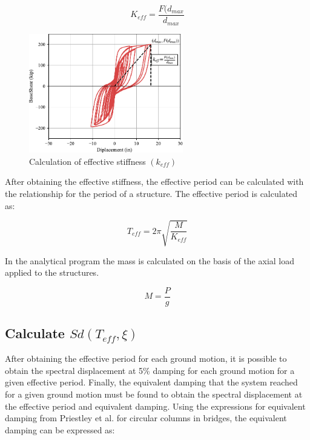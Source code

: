 \begin{equation}
     K_{eff}=\frac{F(d_{max}}{d_{max}}
    \label{eq:Keff_calcualtion}
\end{equation}

\begin{figure}[htbp]
	\centering
	\includegraphics[width=0.60\textwidth]{VAC Thesis 2.0/Chapter-5/figs/Force_Diplacement_Keff_Calc.pdf}
	\caption{Calculation of effective stiffness $(k_{eff})$}
	\label{fig:k_eff_calculation}
\end{figure}

After obtaining the effective stiffness, the effective period can be calculated with the relationship for the period of a structure. The effective period is calculated as:

\begin{equation}
     T_{eff}=2\pi \sqrt{\frac{M}{K_{eff}}}
     
    \label{eq:Teff_calcualtion}
\end{equation}

In the analytical program the mass is calculated on the basis of the axial load applied to the structures. 

\begin{equation}
    M=\frac{P}{g}
    \label{eq:M_calcualtion}
\end{equation}

\subsection{Calculate $Sd(T_{eff},\xi)$}

After obtaining the effective period for each ground motion, it is possible to obtain the spectral displacement at 5\% damping for each ground motion for a given effective period. Finally, the equivalent damping that the system reached for a given ground motion must be found to obtain the spectral displacement at the effective period and equivalent damping. Using the expressions for equivalent damping from Priestley et al. for circular columns in bridges, the equivalent damping can be expressed as:

